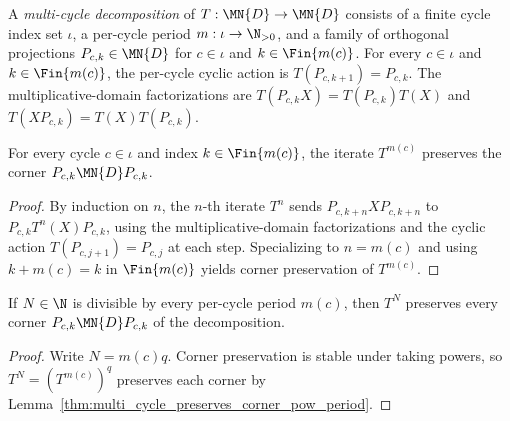 \begin{definition}
    \label{def:multi_cycle_decomposition}
    \leanok
    A \emph{multi-cycle decomposition} of $T:\MN{D}\to\MN{D}$ consists of
    a finite cycle index set $\iota$, a per-cycle period
    $m:\iota\to\N_{>0}$, and a family of orthogonal projections
    $P_{c,k}\in\MN{D}$ for $c\in\iota$ and $k\in\Fin{m(c)}$. For every
    $c\in\iota$ and $k\in\Fin{m(c)}$, the per-cycle cyclic action is
    $T(P_{c,k+1})=P_{c,k}$. The multiplicative-domain factorizations are
    $T(P_{c,k}X)=T(P_{c,k})T(X)$ and
    $T(XP_{c,k})=T(X)T(P_{c,k})$.
\end{definition}

\begin{lemma}
    \label{thm:multi_cycle_preserves_corner_pow_period}
    \leanok
    For every cycle $c\in\iota$ and index $k\in\Fin{m(c)}$, the
    iterate $T^{m(c)}$ preserves the corner $P_{c,k}\MN{D}P_{c,k}$.
\end{lemma}

\begin{proof}
    \leanok
    By induction on $n$, the $n$-th iterate $T^n$ sends
    $P_{c,k+n}XP_{c,k+n}$ to $P_{c,k}T^n(X)P_{c,k}$, using the
    multiplicative-domain factorizations and the cyclic action
    $T(P_{c,j+1})=P_{c,j}$ at each step. Specializing to $n=m(c)$ and using
    $k+m(c)=k$ in $\Fin{m(c)}$ yields corner preservation of $T^{m(c)}$.
\end{proof}

\begin{lemma}
    \label{thm:multi_cycle_preserves_corner_pow_of_dvd}
    \leanok
    If $N\in\N$ is divisible by every per-cycle period $m(c)$, then $T^N$
    preserves every corner $P_{c,k}\MN{D}P_{c,k}$ of the decomposition.
\end{lemma}

\begin{proof}
    \leanok
    Write $N=m(c)q$. Corner preservation is stable under taking powers, so
    $T^N=(T^{m(c)})^q$ preserves each corner by
    Lemma~\ref{thm:multi_cycle_preserves_corner_pow_period}.
\end{proof}

